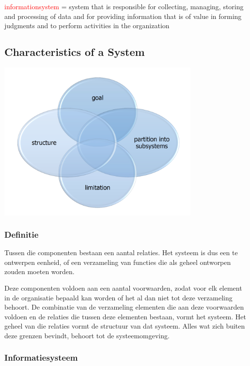 \textcolor{red}{\Gls{informationsystem}} = system that is responsible for collecting, managing, storing and processing of data and for providing information that is of value in forming judgments and to perform activities in the organization


\subsection{Characteristics of a System}

\begin{center}
            \includegraphics[width=4in]{img/osa1.PNG}
\end{center}

\subsubsection{Definitie}

Tussen die componenten bestaan een aantal relaties. Het systeem is dus een te ontwerpen eenheid, of een verzameling van functies die als geheel ontworpen zouden moeten worden.

Deze componenten voldoen aan een aantal voorwaarden, zodat voor elk element in de organisatie bepaald kan worden of het al dan niet tot deze verzameling behoort. De combinatie van de verzameling elementen die aan deze voorwaarden voldoen en de relaties die tussen deze elementen bestaan, vormt het systeem. Het geheel van die relaties vormt de structuur van dat systeem. Alles wat zich buiten deze grenzen bevindt, behoort tot de systeemomgeving.

\subsubsection{Informatiesysteem}

